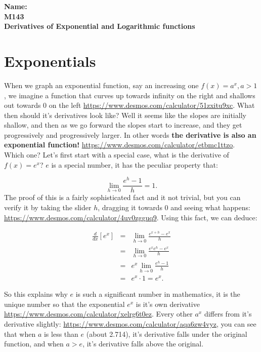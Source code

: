 \documentclass[10pt]{article}
\theoremstyle{definition}
\newcommand{\limit}[2]{\displaystyle{ \lim_{#1 \to #2}}}
\begin{document}
%

{\bf Name:} \hrulefill\hrulefill\hrulefill\\
{\bf M143} \qquad \qquad \\
{\bf Derivatives of Exponential and Logarithmic functions}\\ %

\section{Exponentials}

When we graph an exponential function, say an increasing one $f(x)=a^x, a>1$, we imagine a function that curves up towards infinity on the right and shallows out towards 0 on the left \url{https://www.desmos.com/calculator/51zxitu9xc}.  What then should it's derivatives look like?  Well it seems like the slopes are initially shallow, and then as we go forward the slopes start to increase, and they get progressively and progressively larger.  In other words {\bf the derivative is also an exponential function!} \url{https://www.desmos.com/calculator/etbmc1ttzo}.\\

Which one?  Let's first start with a special case, what is the derivative of $f(x)=e^x$?  $e$ is a special number, it has the peculiar property that:

$$\limit{h}{0}\frac{e^h-1}{h}=1.$$  The proof of this is a fairly sophisticated fact and it not trivial, but you can verify it by taking the slider $h$, dragging it towards 0 and seeing what happens: \url{https://www.desmos.com/calculator/4uv0zgguq9}.  Using this fact, we can deduce:

\begin{eqnarray*}
\frac{d}{dx}[e^x]&=&\limit{h}{0}\frac{e^{x+h}-e^x}{h}\\
&=&\limit{h}{0}\frac{e^xe^h-e^x}{h}\\
&=&e^x\limit{h}{0}\frac{e^h-1}{h}\\
&=&e^x\cdot1=e^x.
\end{eqnarray*}


So this explains why $e$ is such a significant number in mathematics, it is the unique number so that the exponential $e^x$ is it's own derivative \url{https://www.desmos.com/calculator/xelrg6t0ez}.   Every other $a^x$ differs from it's derivative slightly: \url{https://www.desmos.com/calculator/aqa6zw4vyz}, you can see that when $a$ is less than $e$ (about 2.714), it's derivative falls under the original function, and when $a>e$, it's derivative falls above the original.\\
\end{document}
